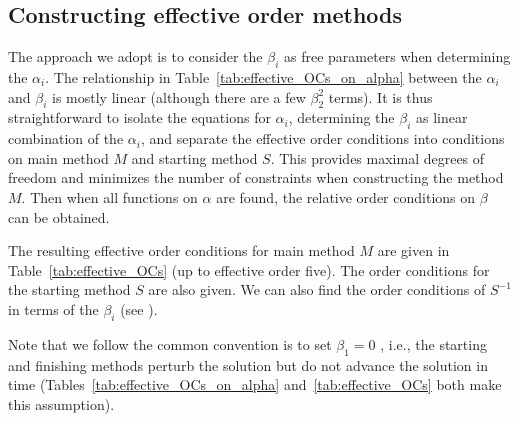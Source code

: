 \subsection{Constructing effective order methods}
The approach we adopt is to consider the $\beta_{i}$ as free
parameters when determining the $\alpha_i$.
The relationship in Table~\ref{tab:effective_OCs_on_alpha} between the
$\alpha_i$ and $\beta_i$ is mostly linear (although there are a few
$\beta_2^2$ terms).
It is thus straightforward to isolate the equations for $\alpha_i$,
determining the $\beta_i$ as linear combination of the $\alpha_i$, and
separate the effective order conditions into conditions on main method
$M$ and starting method $S$.
This provides maximal degrees of freedom and minimizes the number of
constraints when constructing the method $M$.
Then when all functions on $\alpha$ are found, the relative order
conditions on $\beta$ can be obtained.

The resulting effective order conditions for main method $M$ are given
in Table~\ref{tab:effective_OCs} (up to effective order five).
The order conditions for the starting method $S$ are also given.
We can also find the order conditions of
$S^{-1}$
in terms of the
$\beta_i$ (see \cite[Table~386(III)]{Butcher2008_book}).

Note that we follow the common convention is to set $\beta_1=0$
\cite{Butcher2008_book}, i.e., the starting and finishing methods
perturb the solution but do not advance the solution in time
(Tables~\ref{tab:effective_OCs_on_alpha} and~\ref{tab:effective_OCs} both make
this assumption).

